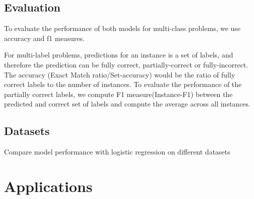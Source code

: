 \section{Evaluation}

To evaluate the performance of both models for multi-class problems, we use accuracy and f1 measures.

For multi-label problems, predictions for an instance is a set of labels, and therefore the prediction can be fully correct, partially-correct or fully-incorrect. The accuracy (Exact Match ratio/Set-accuracy) would be the ratio of fully correct labels to the number of instances. To evaluate the performance of the partially correct labels, we compute F1 measure(Instance-F1) between the predicted and correct set of labels 
and compute the average across all instances.

\section{Datasets}

Compare model performance with logistic regression on different datasets

\begin{table}
\centering
{}
\caption{\label{tab:widgets}Set-Accuracy and Instance-F1 Results.}
\end{table}

\chapter{Applications}

